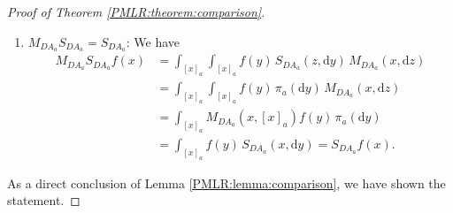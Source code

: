 \documentclass[sn-mathphys-num]{sn-jnl}%
\theoremstyle{thmstyleone}%
\theoremstyle{thmstyletwo}%
\theoremstyle{thmstylethree}%
\newcommand{\rhoapp}{\varrho_{{\rm app}}}
\begin{document}
\begin{appendices}
\begin{proof}[Proof of Theorem \ref{PMLR:theorem:comparison}]
\begin{enumerate}
\begin{align*}
		\end{align*} 
		We can write the first term in the sum as
		\begin{align*}
			&\int_{[x]_{a}}^{} \int_{[x]_{a}}^{} f(y) f(x) \mathbb{1}_{G_{s, \varrho_{\textmd{app}}}\cap G_{t,\widehat{\varrho}}}(y)  \, Q(x,\mathrm{d}y)  \, \pi_{{a}}(\mathrm{d}x) \\
			&\quad = c \int_{G}^{} \int_{G}^{} f(y) f(x) \mathbb{1}_{G_{s, \varrho_{\textmd{app}}}\cap G_{t,\widehat{\varrho}}}(y)\ \mathbb{1}_{G_{s, \varrho_{\textmd{app}}}\cap G_{t,\widehat{\varrho}}}(x)  \, Q(x,\mathrm{d}y)  \, \pi_0(\mathrm{d}x) \\ 
			&\quad= c \, \langle Q\mathbb{1}_{G_{s,\varrho_{\textmd{app}}}\cap G_{t,\widehat{\varrho}}}f, \mathbb{1}_{G_{s, \varrho_{\textmd{app}}}\cap G_{t,\widehat{\varrho}}}f \rangle_{\pi_0}. 
		\end{align*}
		Finally, by the positivity of $Q$ on $L^2_{\pi_0}(G)$ we get
		\begin{align*}
			\langle M_{DA_{{a}}}f, f \rangle_{\pi_{{a}}}  
			& = c \, \langle Q\mathbb{1}_{G_{s,\varrho_{\textmd{app}}}\cap G_{t,\widehat{\varrho}}}f, \mathbb{1}_{G_{s,\varrho_{\textmd{app}}}\cap G_{t,\widehat{\varrho}}}f \rangle_{\pi_0} \\
            & \qquad +\int_{[x]_{a}} (1-Q(x, G_{s,\varrho_{\textmd{app}}}\cap G_{t,\widehat{\varrho}})) f(x)^2  \, \pi_{{a}}(\mathrm{d}x) 
			\geq 0. 
		\end{align*}
		\item \emph{$M_{DA_{{a}}} S_{DA_{{a}}}=S_{DA_{{a}}}$}: We have
		\begin{align*}
			M_{DA_{{a}}} S_{DA_{{a}}}f(x)
			&=\int_{[x]_{a}}^{}\int_{[x]_{a}}^{} f(y)  \,  S_{DA_{{a}}}(z, \mathrm{d}y)  \,  M_{DA_{{a}}}(x, \mathrm{d}z) \\  
			&=\int_{[x]_{a}}^{}\int_{[x]_{a}}^{} f(y)  \,  \pi_a(\mathrm{d}y)  \,  M_{DA_{{a}}}(x, \mathrm{d}z) \\ 
			&=\int_{[x]_{a}} 
			M_{DA_{{a}}}(x, [x]_{a})
			f(y)  \, \pi_a(\mathrm{d}y) \\ 
			&=\int_{[x]_{a}}^{} f(y)  \,  S_{DA_{{a}}}(x, \mathrm{d}y)
			= S_{DA_{{a}}}f(x). 
		\end{align*}
	\end{enumerate}
	As a direct conclusion of Lemma \ref{PMLR:lemma:comparison}, we have shown the statement.  
\end{proof}


\end{appendices}
\end{document}
